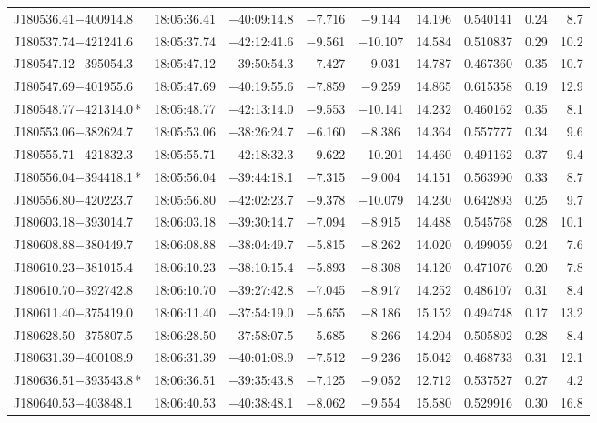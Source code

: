 \begin{table*}
\begin{tabular}{lcccccccr}
J180536.41$-$400914.8 & 18:05:36.41 & $-$40:09:14.8 & $-$7.716 & $-$9.144 & 14.196 & 0.540141 & 0.24 & 8.7 \\
J180537.74$-$421241.6 & 18:05:37.74 & $-$42:12:41.6 & $-$9.561 & $-$10.107 & 14.584 & 0.510837 & 0.29 & 10.2 \\
J180547.12$-$395054.3 & 18:05:47.12 & $-$39:50:54.3 & $-$7.427 & $-$9.031 & 14.787 & 0.467360 & 0.35 & 10.7 \\
J180547.69$-$401955.6 & 18:05:47.69 & $-$40:19:55.6 & $-$7.859 & $-$9.259 & 14.865 & 0.615358 & 0.19 & 12.9 \\
J180548.77$-$421314.0\,* & 18:05:48.77 & $-$42:13:14.0 & $-$9.553 & $-$10.141 & 14.232 & 0.460162 & 0.35 & 8.1 \\
J180553.06$-$382624.7 & 18:05:53.06 & $-$38:26:24.7 & $-$6.160 & $-$8.386 & 14.364 & 0.557777 & 0.34 & 9.6 \\
J180555.71$-$421832.3 & 18:05:55.71 & $-$42:18:32.3 & $-$9.622 & $-$10.201 & 14.460 & 0.491162 & 0.37 & 9.4 \\
J180556.04$-$394418.1\,* & 18:05:56.04 & $-$39:44:18.1 & $-$7.315 & $-$9.004 & 14.151 & 0.563990 & 0.33 & 8.7 \\
J180556.80$-$420223.7 & 18:05:56.80 & $-$42:02:23.7 & $-$9.378 & $-$10.079 & 14.230 & 0.642893 & 0.25 & 9.7 \\
J180603.18$-$393014.7 & 18:06:03.18 & $-$39:30:14.7 & $-$7.094 & $-$8.915 & 14.488 & 0.545768 & 0.28 & 10.1 \\
J180608.88$-$380449.7 & 18:06:08.88 & $-$38:04:49.7 & $-$5.815 & $-$8.262 & 14.020 & 0.499059 & 0.24 & 7.6 \\
J180610.23$-$381015.4 & 18:06:10.23 & $-$38:10:15.4 & $-$5.893 & $-$8.308 & 14.120 & 0.471076 & 0.20 & 7.8 \\
J180610.70$-$392742.8 & 18:06:10.70 & $-$39:27:42.8 & $-$7.045 & $-$8.917 & 14.252 & 0.486107 & 0.31 & 8.4 \\
J180611.40$-$375419.0 & 18:06:11.40 & $-$37:54:19.0 & $-$5.655 & $-$8.186 & 15.152 & 0.494748 & 0.17 & 13.2 \\
J180628.50$-$375807.5 & 18:06:28.50 & $-$37:58:07.5 & $-$5.685 & $-$8.266 & 14.204 & 0.505802 & 0.28 & 8.4 \\
J180631.39$-$400108.9 & 18:06:31.39 & $-$40:01:08.9 & $-$7.512 & $-$9.236 & 15.042 & 0.468733 & 0.31 & 12.1 \\
J180636.51$-$393543.8\,* & 18:06:36.51 & $-$39:35:43.8 & $-$7.125 & $-$9.052 & 12.712 & 0.537527 & 0.27 & 4.2 \\
J180640.53$-$403848.1 & 18:06:40.53 & $-$40:38:48.1 & $-$8.062 & $-$9.554 & 15.580 & 0.529916 & 0.30 & 16.8 \\

\end{tabular}
\end{table*}
